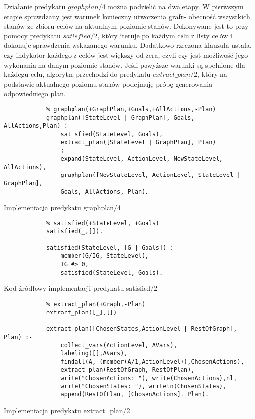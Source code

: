     Działanie predykatu $graphplan/4$ można podzielić na dwa etapy. W pierwszym etapie sprawdzany jest warunek konieczny utworzenia grafu- 
    obecność wszystkich stanów ze zbioru celów na aktualnym poziomie stanów. Dokonywane jest to przy pomocy predykatu $satisfied/2$, który 
    iteruje po każdym celu z listy celów i dokonuje sprawdzenia wskazanego warunku. Dodatkowo rzeczona klauzula ustala, czy indykator każdego z 
    celów jest większy od zera, czyli czy jest możliwość jego wykonania na danym poziomie stanów. Jeśli powyższe warunki są spełnione dla każdegu celu, 
    algorytm przechodzi do predykatu $extract\_plan/2$, który na podstawie aktualnego poziomu stanów 
    podejmuję próbę generowania odpowiedniego plan. 
    
    \begin{listing}[H]
        \begin{verbatim}
            % graphplan(+GraphPlan,+Goals,+AllActions,-Plan)
            graphplan([StateLevel | GraphPlan], Goals, AllActions,Plan) :-
                satisfied(StateLevel, Goals),
                extract_plan([StateLevel | GraphPlan], Plan)
                ;
                expand(StateLevel, ActionLevel, NewStateLevel, AllActions),
                graphplan([NewStateLevel, ActionLevel, StateLevel | GraphPlan], 
                Goals, AllActions, Plan).
    \end{verbatim}
    \caption{Implementacja predykatu graphplan/4}
    \end{listing}
    
    \begin{listing}[H]
        \begin{verbatim}
            % satisfied(+StateLevel, +Goals)
            satisfied(_,[]).

            satisfied(StateLevel, [G | Goals]) :-
                member(G/IG, StateLevel),
                IG #> 0,
                satisfied(StateLevel, Goals).
    \end{verbatim}
    \caption{Kod źródłowy implementacji predykatu satisfied/2}
    \end{listing}

    \begin{listing}[H]
        \begin{verbatim}
            % extract_plan(+Graph,-Plan)
            extract_plan([_],[]).

            extract_plan([ChosenStates,ActionLevel | RestOfGraph], Plan) :-
                collect_vars(ActionLevel, AVars),
                labeling([],AVars),
                findall(A, (member(A/1,ActionLevel)),ChosenActions),
                extract_plan(RestOfGraph, RestOfPlan),
                write("ChosenActions: "), write(ChosenActions),nl,
                write("ChosenStates: "), writeln(ChosenStates),
                append(RestOfPlan, [ChosenActions], Plan).
    \end{verbatim}
    \caption{Implementacja predykatu extract\_plan/2}
    \end{listing}

